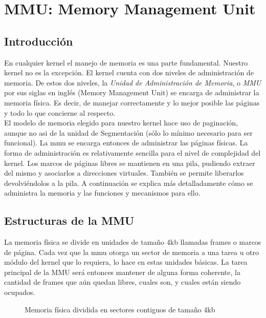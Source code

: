 \section{MMU: Memory Management Unit}

\subsection{Introducción}
En cualquier kernel el manejo de memoria es una parte fundamental. Nuestro kernel no es la excepción. El kernel cuenta con dos niveles de administración
de memoria. De estos dos niveles, la \textit{Unidad de Administración de Memoria}, o \textit{MMU} por sus siglas en inglés (Memory Management Unit) se encarga de administrar la memoria física. 
Es decir, de manejar correctamente y lo mejor posible las páginas y todo lo que concierne al respecto. \\
El modelo de memoria elegido para nuestro kernel hace uso de paginación, aunque no asi de la unidad de Segmentación (sólo lo mínimo necesario para ser funcional). La mmu se encarga entonces 
de administrar las páginas físicas. La forma de administración es relativamente sencilla para el nivel de complejidad del kernel. Los marcos de páginas libres se mantienen en una pila, 
pudiendo extraer del mismo y asociarlos a direcciones virtuales. También se permite liberarlos devolviéndolos a la pila. A continuación se explica más detalladamente cómo se administra la memoria 
y las funciones y mecanismos para ello.

\subsection{Estructuras de la MMU}
La memoria física se divide en unidades de tamaño 4kb llamadas frames o marcos de página. Cada vez que la mmu otorga un sector de memoria a una tarea u otro módulo del kernel que lo requiera, lo 
hace en estas unidades básicas. La tarea principal de la MMU será entonces mantener de alguna forma coherente, la cantidad de frames que aún quedan libres, cuales son, y cuales están siendo ocupados.

\begin{figure}[H]
\centering
{}
\caption{Memoria física dividida en sectores contiguos de tamaño 4kb}
\end{figure}


